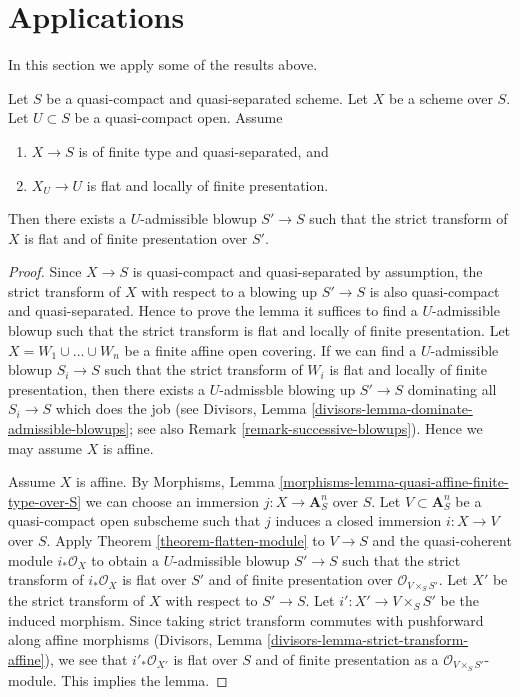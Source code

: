 \section{Applications}
\label{section-applications}

\noindent
In this section we apply some of the results above.

\begin{lemma}
\label{lemma-flat-after-blowing-up}
Let $S$ be a quasi-compact and quasi-separated scheme.
Let $X$ be a scheme over $S$.
Let $U \subset S$ be a quasi-compact open.
Assume
\begin{enumerate}
\item $X \to S$ is of finite type and quasi-separated, and
\item $X_U \to U$ is flat and locally of finite presentation.
\end{enumerate}
Then there exists a $U$-admissible blowup $S' \to S$ such that
the strict transform of $X$ is flat and of finite presentation
over $S'$.
\end{lemma}

\begin{proof}
Since $X \to S$ is quasi-compact and quasi-separated by assumption,
the strict transform of $X$ with respect to a blowing up $S' \to S$
is also quasi-compact and quasi-separated. Hence to prove the lemma
it suffices to find a $U$-admissible blowup such that the strict
transform is flat and locally of finite presentation.
Let $X = W_1 \cup \ldots \cup W_n$ be a finite affine open covering.
If we can find a $U$-admissible blowup $S_i \to S$ such that the
strict transform of $W_i$ is flat and locally of finite presentation,
then there exists a $U$-admissble blowing up $S' \to S$ dominating
all $S_i \to S$ which does the job (see
Divisors, Lemma \ref{divisors-lemma-dominate-admissible-blowups};
see also Remark \ref{remark-successive-blowups}).
Hence we may assume $X$ is affine.

\medskip\noindent
Assume $X$ is affine. By
Morphisms, Lemma \ref{morphisms-lemma-quasi-affine-finite-type-over-S}
we can choose an immersion $j : X \to \mathbf{A}^n_S$ over $S$.
Let $V \subset \mathbf{A}^n_S$ be a quasi-compact open subscheme
such that $j$ induces a closed immersion $i : X \to V$ over $S$. Apply
Theorem \ref{theorem-flatten-module}
to $V \to S$ and the quasi-coherent module $i_*\mathcal{O}_X$
to obtain a $U$-admissible blowup $S' \to S$ such that the strict
transform of $i_*\mathcal{O}_X$ is flat over $S'$ and of finite presentation
over $\mathcal{O}_{V \times_S S'}$. Let $X'$ be the strict transform
of $X$ with respect to $S' \to S$. Let $i' : X' \to V \times_S S'$
be the induced morphism.
Since taking strict transform commutes with pushforward along affine
morphisms (Divisors, Lemma \ref{divisors-lemma-strict-transform-affine}),
we see that $i'_*\mathcal{O}_{X'}$ is flat over $S$ and of
finite presentation as a $\mathcal{O}_{V \times_S S'}$-module.
This implies the lemma.
\end{proof}


